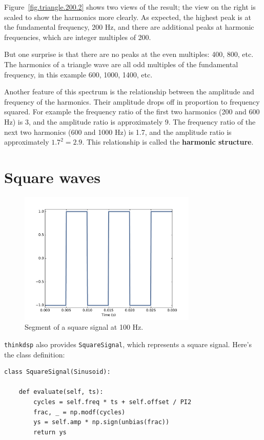 \documentclass[12pt]{book}
\begin{document}
Figure~\ref{fig.triangle.200.2} shows two views of the result; the
view on the right is scaled to show the harmonics more clearly.  As
expected, the highest peak is at the fundamental frequency, 200 Hz,
and there are additional peaks at harmonic frequencies, which are
integer multiples of 200.

But one surprise is that there are no peaks at the even multiples:
400, 800, etc.  The harmonics of a triangle wave are all
odd multiples of the fundamental frequency, in this example
600, 1000, 1400, etc.

Another feature of this spectrum is the relationship between the
amplitude and frequency of the harmonics.  Their amplitude drops off
in proportion to frequency squared.  For example the frequency ratio
of the first two harmonics (200 and 600 Hz) is 3, and the amplitude
ratio is approximately 9.  The frequency ratio of the next two
harmonics (600 and 1000 Hz) is 1.7, and the amplitude ratio is
approximately $1.7^2 = 2.9$.  This relationship is called the
{\bf harmonic structure}.


\section{Square waves}
\label{square}

\begin{figure}
\centerline{\includegraphics[height=2.5in]{figs/square-100-1.pdf}}
\caption{Segment of a square signal at 100 Hz.}
\label{fig.square.100.1}
\end{figure}

{\tt thinkdsp} also provides {\tt SquareSignal}, which represents
a square signal.  Here's the class definition:

\begin{verbatim}
class SquareSignal(Sinusoid):

    def evaluate(self, ts):
        cycles = self.freq * ts + self.offset / PI2
        frac, _ = np.modf(cycles)
        ys = self.amp * np.sign(unbias(frac))
        return ys
\end{verbatim}
\end{document}
